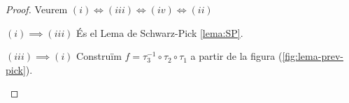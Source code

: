 \documentclass[dvipsnames, svgnames, leqno, a4paper, 12pt]{report}
\begin{document}
    \begin{proof} Veurem $(i)\iff(iii)\iff(iv)\iff(ii)$

        \large
        $(i)\implies(iii)$
        \normalsize
        És el Lema de Schwarz-Pick \ref{lema:SP}.
        
        \large
        $(iii)\implies(i)$
        \normalsize
        Construïm $f=\tau_3^{-1}\circ\tau_2\circ\tau_1$ a partir de la figura (\ref{fig:lema-prev-pick}).

\begin{figure}[H]
    \centering

    \begin{tikzpicture}[x=0.75pt,y=0.75pt,yscale=-1,xscale=1]
    

\end{tikzpicture}
\end{figure}
\end{proof}
\end{document}
